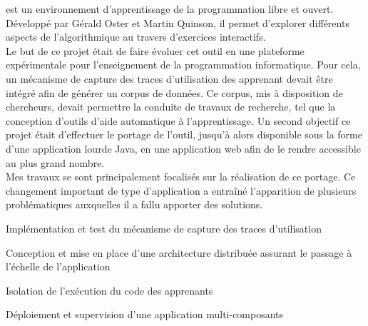 \documentclass[]{deedy-resume-openfont}
\begin{document}
\sectionsep

\hfill\begin{minipage}{\dimexpr\textwidth-0.5cm}
\href{http://people.irisa.fr/Martin.Quinson/Teaching/PLM/}{}
est un environnement d’apprentissage de la programmation libre et ouvert.
Développé par Gérald Oster et Martin Quinson, il permet d’explorer différents aspects de l’algorithmique
au travers d’exercices interactifs.
\\
Le but de ce projet était de faire évoluer cet outil en une plateforme expérimentale
pour l'enseignement de la programmation informatique.
Pour cela, un mécanisme de capture des traces d'utilisation des apprenant
devait être intégré afin de générer un corpus de données.
Ce corpus, mis à disposition de chercheurs, devait permettre
la conduite de travaux de recherche, tel que la conception d'outils d'aide automatique à l'apprentissage.
Un second objectif ce projet était d'effectuer le portage de l'outil,
jusqu'à alors disponible sous la forme d'une application lourde Java,
en une application web afin de le rendre accessible au plus grand nombre.
\\
Mes travaux se sont principalement focalisés sur la réalisation de ce portage.
Ce changement important de type d'application a entraîné l'apparition de plusieurs problématiques
auxquelles il a fallu apporter des solutions.
\begin{tightemize}
\item Implémentation et test du mécanisme de capture des traces d'utilisation
\item Conception et mise en place d'une architecture distribuée assurant le passage à l'échelle de l'application
\item Isolation de l'exécution du code des apprenants
\item Déploiement et supervision d'une application multi-composants
\end{tightemize}
\sectionsep\xdef\tpd{\the\prevdepth}
\end{minipage}

\sectionsep
\end{document}
